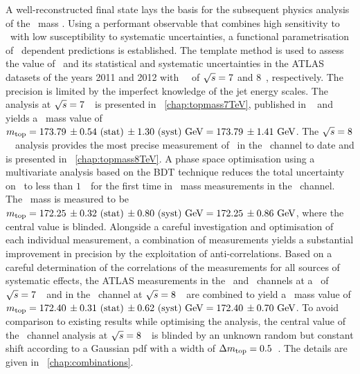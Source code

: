 A well-reconstructed final state lays the basis for the subsequent physics analysis of the \tquark\ mass \mt. Using a performant observable that combines high sensitivity to \mt\ with low susceptibility to systematic uncertainties, a functional parametrisation of \mt\ dependent predictions is established. The template method is used to assess the value of \mt\ and its statistical and systematic uncertainties in the \gls{ATLAS} datasets of the years 2011 and 2012 with \pp\ \cmes\ of ${\sqrt{s}}=7$ and $8$~\TeV, respectively. The precision is limited by the imperfect knowledge of the jet energy scales.  
%
The analysis at ${\sqrt{s}}=7$~\TeV\ is presented in \chap~\ref{chap:topmass7TeV}, published in ~\cite{Aad:2015nba} and yields a \tquark\ mass value of $m_{\mathrm{top}} = 173.79\,\pm 0.54~\mathrm{(stat)}\,\pm 1.30~\mathrm{(syst)}~\mathrm{GeV}=173.79\,\pm 1.41~\mathrm{GeV}$.
%
The ${\sqrt{s}}=8$~\TeV\ analysis provides the most precise measurement of \mt\ in the \dil\ channel to date and is presented in \chap~\ref{chap:topmass8TeV}. A phase space optimisation using a multivariate analysis based on the \gls{BDT} technique reduces the total uncertainty on \mt\ to less than $1$~\GeV\ for the first time in \tquark\ mass measurements in the \dil\ channel. The \tquark\ mass is measured to be $m_{\mathrm{top}} = 172.25\,\pm 0.32~\mathrm{(stat)}\,\pm 0.80~\mathrm{(syst)}~\mathrm{GeV}=172.25\,\pm 0.86~\mathrm{GeV}$, where the central value is blinded.
%
%
Alongside a careful investigation and optimisation of each individual measurement, a combination of measurements yields a substantial improvement in precision by the exploitation of anti-correlations. 
%
Based on a careful determination of the correlations of the measurements for all sources of systematic effects, the \gls{ATLAS} measurements in the \ljets\ and \dil\ channels at a \cme\ of ${\sqrt{s}}=7$~\TeV\ and in the \dil\ channel at ${\sqrt{s}}=8$~\TeV\ are combined to yield a \tquark\ mass value of $m_{\mathrm{top}} = 172.40\,\pm 0.31~\mathrm{(stat)}\,\pm 0.62~\mathrm{(syst)}~\mathrm{GeV} = 172.40\,\pm 0.70~\mathrm{GeV}$. 
%
To avoid comparison to existing results while optimising the analysis, the central value of the \dil\ channel analysis at ${\sqrt{s}}=8$~\TeV\ is blinded by an unknown random but constant shift according to a Gaussian \gls{pdf} with a width of $\Delta m_{\mathrm{top}}=0.5$~\GeV.
%
The details are given in \chap~\ref{chap:combinations}.


